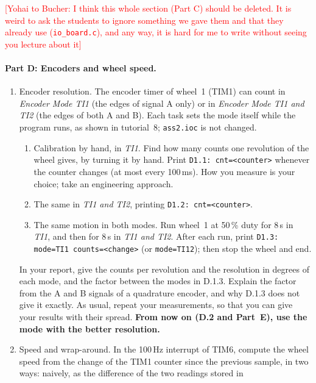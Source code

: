 \documentclass[11pt,a4paper]{article}
\newcommand{\flag}[1]{\textcolor{red}{[#1]}}
\begin{document}
\flag{Yohai to Bucher: I think this whole section (Part C) should be deleted. It is weird to ask the students to
ignore something we gave them and that they already use (\texttt{io\_board.c}), and any way, it is hard for me to write without seeing you lecture about it}

\paragraph{Part D: Encoders and wheel speed.}
\begin{enumerate}[label=D.\arabic*, leftmargin=2.2em]
  \item Encoder resolution. The encoder timer of wheel~1 (TIM1) can count in \emph{Encoder Mode TI1} (the edges of
        signal A only) or in \emph{Encoder Mode TI1 and TI2} (the edges of both A and B). Each task sets the mode
        itself while the program runs, as shown in tutorial~8; \texttt{ass2.ioc} is not changed.
        \begin{enumerate}[label=D.1.\arabic*, leftmargin=3.2em]
          \item Calibration by hand, in \emph{TI1}. Find how many counts one revolution of the wheel gives, by turning
                it by hand. Print \texttt{D1.1: cnt=<counter>} whenever the counter changes (at most every 100\,ms).
                How you measure is your choice; take an engineering approach.
          \item The same in \emph{TI1 and TI2}, printing \texttt{D1.2: cnt=<counter>}.
          \item The same motion in both modes. Run wheel~1 at 50\,\% duty for 8\,s in \emph{TI1}, and then for 8\,s in
                \emph{TI1 and TI2}. After each run, print \texttt{D1.3: mode=TI1 counts=<change>} (or
                \texttt{mode=TI12}); then stop the wheel and end.
        \end{enumerate}
        In your report, give the counts per revolution and the resolution in degrees of each mode, and the factor
        between the modes in D.1.3. Explain the factor from the A and B signals of a quadrature encoder, and why
        D.1.3 does not give it exactly. As usual, repeat your measurements, so that you can give your results with
        their spread. \textbf{From now on (D.2 and Part~E), use the mode with the better resolution.}
  \item Speed and wrap-around. In the 100\,Hz interrupt of TIM6, compute the wheel speed from the change of the TIM1
        counter since the previous sample, in two ways: naively, as the difference of the two readings stored in

\end{enumerate}
\end{document}
